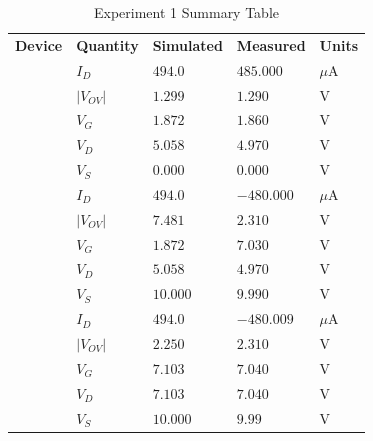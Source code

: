 \begin{center}
	\begin{table}[H]
	\centering
	\renewcommand{\arraystretch}{1.0}
	\begin{tabular}{ | >{\centering\arraybackslash} m{2.5cm} | >{\centering\arraybackslash} m{2.5cm} | >{\centering\arraybackslash} m{2.5cm} | >{\centering\arraybackslash} m{2.5cm} | >{\centering\arraybackslash} m{2.5cm} | }
	\hline
	\multicolumn{5}{|c|}{\textbf{Experiment 1 Summary Table}} \\ \hline
	\textbf{Device} & \textbf{Quantity} & \textbf{Simulated} &\textbf{Measured} & \textbf{Units} \\ \hline
		\multirow{5}{*}{\(Q_1\)} 
		& \(I_{D}\)    & \(494.0\)  & $485.000$ & $\mu$A \\ \cline{2-5}
		& \(|V_{OV}|\) & \(1.299\)  & $1.290$ & V  \\ \cline{2-5}
		& \(V_{G}\)    & \(1.872\)  & $1.860$ & V  \\ \cline{2-5}
		& \(V_{D}\)    & \(5.058\)  & $4.970$ & V  \\ \cline{2-5}
		& \(V_{S}\)    & \(0.000\)  & $0.000$ & V  \\ \hline
		\multirow{5}{*}{\(Q_2\)}
		& \(I_{D}\)    & \(494.0\)  & $-480.000$ & $\mu$A \\ \cline{2-5}
		& \(|V_{OV}|\) & \(7.481\)  & $2.310$ & V \\ \cline{2-5}
		& \(V_{G}\)    & \(1.872\)  & $7.030$ & V \\ \cline{2-5}
		& \(V_{D}\)    & \(5.058\)  & $4.970$ & V \\ \cline{2-5}
		& \(V_{S}\)    & \(10.000\) & $9.990$ & V \\ \hline
		\multirow{5}{*}{\(Q_3\)}
		& \(I_{D}\)    & \(494.0\)  & $-480.009$ & $\mu$A \\ \cline{2-5}
		& \(|V_{OV}|\) & \(2.250\)  & $2.310$ & V \\ \cline{2-5}
		& \(V_{G}\)    & \(7.103\)  & $7.040$ & V \\ \cline{2-5}
		& \(V_{D}\)    & \(7.103\)  & $7.040$ & V \\ \cline{2-5}
		& \(V_{S}\)    & \(10.000\) & $9.99$ & V \\ \hline
	\end{tabular}
	\caption{Experiment 1 Summary Table}
	\end{table}
\end{center}

